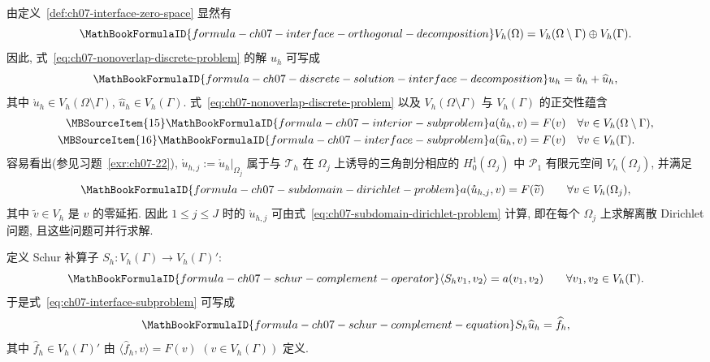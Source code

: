 由定义~\ref{def:ch07-interface-zero-space} 显然有
\begin{equation}
\MathBookFormulaID{formula-ch07-interface-orthogonal-decomposition}
\label{eq:ch07-interface-orthogonal-decomposition}
V_h(\Omega)=V_h(\Omega\setminus\Gamma)\oplus V_h(\Gamma).
\end{equation}
因此, 式~\eqref{eq:ch07-nonoverlap-discrete-problem} 的解 $u_h$ 可写成
\begin{equation}
\MathBookFormulaID{formula-ch07-discrete-solution-interface-decomposition}
\label{eq:ch07-discrete-solution-interface-decomposition}
u_h=\mathring u_h+\widehat u_h,
\end{equation}
其中 $\mathring u_h\in V_h(\Omega\setminus\Gamma)$, $\widehat u_h\in V_h(\Gamma)$. 式~\eqref{eq:ch07-nonoverlap-discrete-problem} 以及 $V_h(\Omega\setminus\Gamma)$ 与 $V_h(\Gamma)$ 的正交性蕴含
\begin{align}
\MBSourceItem{15}
\MathBookFormulaID{formula-ch07-interior-subproblem}
a(\mathring u_h,v)&=F(v)&&\forall v\in V_h(\Omega\setminus\Gamma),
\label{eq:ch07-interior-subproblem}\\
\MBSourceItem{16}
\MathBookFormulaID{formula-ch07-interface-subproblem}
a(\widehat u_h,v)&=F(v)&&\forall v\in V_h(\Gamma).
\label{eq:ch07-interface-subproblem}
\end{align}
容易看出(参见习题~\ref{exr:ch07-22}), $\mathring u_{h,j}:=\mathring u_h|_{\Omega_j}$ 属于与 $\mathcal T_h$ 在 $\Omega_j$ 上诱导的三角剖分相应的 $H_0^1(\Omega_j)$ 中 $\mathcal P_1$ 有限元空间 $V_h(\Omega_j)$, 并满足
\begin{equation}
\MathBookFormulaID{formula-ch07-subdomain-dirichlet-problem}
\label{eq:ch07-subdomain-dirichlet-problem}
a(\mathring u_{h,j},v)=F(\widetilde v)
\qquad\forall v\in V_h(\Omega_j),
\end{equation}
其中 $\widetilde v\in V_h$ 是 $v$ 的零延拓. 因此 $1\leq j\leq J$ 时的 $\mathring u_{h,j}$ 可由式~\eqref{eq:ch07-subdomain-dirichlet-problem} 计算, 即在每个 $\Omega_j$ 上求解离散 Dirichlet 问题, 且这些问题可并行求解.

定义 Schur 补算子 $S_h:V_h(\Gamma)\longrightarrow V_h(\Gamma)'$:
\begin{equation}
\MathBookFormulaID{formula-ch07-schur-complement-operator}
\label{eq:ch07-schur-complement-operator}
\langle S_hv_1,v_2\rangle=a(v_1,v_2)
\qquad\forall v_1,v_2\in V_h(\Gamma).
\end{equation}
于是式~\eqref{eq:ch07-interface-subproblem} 可写成
\begin{equation}
\MathBookFormulaID{formula-ch07-schur-complement-equation}
\label{eq:ch07-schur-complement-equation}
S_h\widehat u_h=\widehat f_h,
\end{equation}
其中 $\widehat f_h\in V_h(\Gamma)'$ 由 $\langle\widehat f_h,v\rangle=F(v)$ $(v\in V_h(\Gamma))$ 定义.


